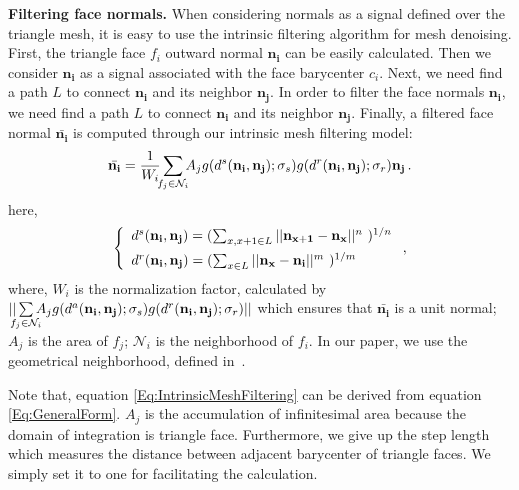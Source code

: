 {\bfseries Filtering face normals.}
When considering normals as a signal defined over the triangle mesh, it is easy to use the intrinsic filtering algorithm for mesh denoising.
First, the triangle face $f_{i}$ outward normal $\mathbf{n_{i}}$ can be easily calculated.
Then we consider $\mathbf{n_{i}}$ as a signal associated with the face barycenter $c_{i}$.
Next, we need find a path $L$ to connect $\mathbf{n_{i}}$ and its neighbor $\mathbf{n_{j}}$.
In order to filter the face normals $\mathbf{n_{i}}$, we need find a path $L$ to connect $\mathbf{n_{i}}$ and its neighbor $\mathbf{n_{j}}$.
Finally, a filtered face normal $\bar{\mathbf{n_{i}}}$ is computed through our intrinsic mesh filtering model:
 \begin{equation}
 \label{Eq:IntrinsicMeshFiltering}
 \bar{\mathbf{n_{i}}} = \frac{1}{W_{i}}\sum_{\mathclap{f_{j}\in\mathcal{N}_{i}}}A_{j}g(d^{s}(\mathbf{n_{i}}, \mathbf{n_{j}}); \sigma_{s})g(d^{r}(\mathbf{n_{i}}, \mathbf{n_{j}}); \sigma_{r})\mathbf{n_{j}}\, .
 \end{equation}
  here,
 \begin{equation}
 \label{eq:IntrinsicMeshDistance}
 \left \{
 \begin{array}{ll}
        d^{s}(\mathbf{n_{i}}, \mathbf{n_{j}}) = (\sum_{x, x+1\in{L}}||\mathbf{n_{x+1}}-\mathbf{n_{x}}||^{n}\,\,)^{1/n} \vspace{1.5mm} \\
        d^{r}(\mathbf{n_{i}}, \mathbf{n_{j}}) = (\sum_{x\in{L}}||\mathbf{n_{x}}-\mathbf{n_{i}}||^{m}\,\,)^{1/m} \\
 \end{array}
 \right. ,
 \end{equation}
where, $W_{i}$ is the normalization factor,
calculated by
$||\sum\limits_{\mathclap{f_{j}\in\mathcal{N}_{i}}}A_{j}g(d^{a}(\mathbf{n_{i}}, \mathbf{n_{j}}); \sigma_{s})g(d^{r}(\mathbf{n_{i}}, \mathbf{n_{j}}); \sigma_{r})||$
which ensures that $\bar{\mathbf{n_{i}}}$ is a unit normal;
$A_j$ is the area of $f_j$;
$\mathcal{N}_{i}$ is the neighborhood of $f_{i}$.
In our paper, we use the geometrical neighborhood, defined in~\cite{Zhang2015Filter}.

Note that, equation \ref{Eq:IntrinsicMeshFiltering} can be derived from equation \ref{Eq:GeneralForm}.
$A_j$ is the accumulation of infinitesimal area because the domain of integration is triangle face.
Furthermore, we give up the step length which measures the distance between adjacent barycenter of triangle faces. %
We simply set it to one for facilitating the calculation.

